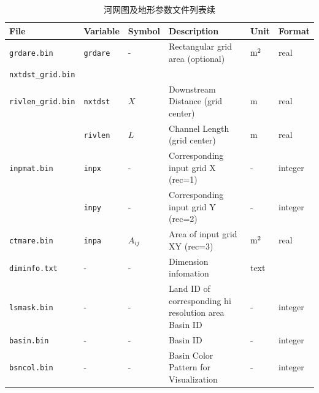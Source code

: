 \begin{table}[]
\centering
\caption{河网图及地形参数文件列表续}
\label{tab:河网图及地形参数文件列表2}
    \begin{tabular}[h]{p{3.5cm}p{1.5cm}p{1.5cm}p{5cm}p{1cm}p{1cm}} %
    \toprule
    File             & Variable & Symbol                             & Description                                          & Unit     & Format  \\ \midrule
    \texttt{grdare.bin}       & \texttt{grdare}   & -                                  & Rectangular grid area (optional)                     & $\rm m^2$       & real    \\
    \texttt{nxtdst\_grid.bin} &          &                                    &                                                      &          &         \\
    \texttt{rivlen\_grid.bin} & \texttt{nxtdst}   & $X$                                  & Downstream Distance (grid center)                    & m        & real    \\
                                        & \texttt{rivlen}    & $L$                            & Channel Length (grid center)       &    m                             & real        \\
    \texttt{inpmat.bin}       & \texttt{inpx}     & -                                  & Corresponding input grid X (rec=1) & -        & integer \\
                                       & \texttt{inpy}     & -                               & Corresponding input grid Y (rec=2)    & -        & integer  \\
    \texttt{ctmare.bin}       & \texttt{inpa}     & $A_{ij}$                            & Area of input grid XY (rec=3)              & $\rm m^2$     & real    \\
    \texttt{diminfo.txt}      & -        & -                                  & Dimension infomation                         & text     &         \\
    \texttt{lsmask.bin}       & -        & -                                  & Land ID of corresponding hi resolution area Basin ID & -        & integer \\
    \texttt{basin.bin}        & -        & -                                  & Basin ID                                             & -        & integer \\
    \texttt{bsncol.bin}       & -        & -                                  & Basin Color Pattern for Visualization                & -        & integer \\

\end{tabular}
\end{table}
